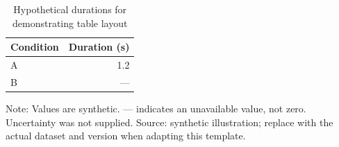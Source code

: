 \documentclass{article}
\begin{document}
\begin{table}[ht]
  \centering
  \caption{Hypothetical durations for demonstrating table layout}
  \label{tab:duration-example}
  \begin{tabular}{lr}
    \toprule
    Condition & Duration (s) \\
    \midrule
    A & 1.2 \\
    B & --- \\
    \bottomrule
  \end{tabular}
  \par\smallskip
  \begin{minipage}{0.8\linewidth}\small
    Note: Values are synthetic. --- indicates an unavailable value, not zero.
    Uncertainty was not supplied. Source: synthetic illustration; replace with
    the actual dataset and version when adapting this template.
  \end{minipage}
\end{table}
\end{document}
